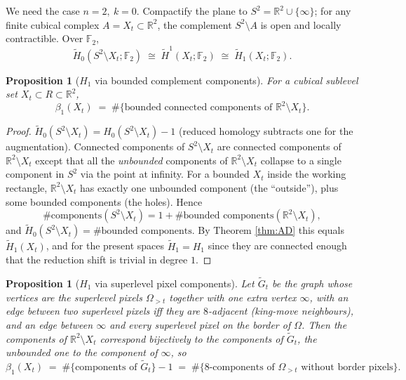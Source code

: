 \documentclass[11pt]{article}
\theoremstyle{persdef}
\newtheorem{proposition}[definition]{Proposition}
\newcommand{\R}{\mathbb{R}}
\newcommand{\F}{\mathbb{F}}
\newcommand{\Ftwo}{\F_2}
\newcommand{\X}{X}
\newcommand{\sublevG}[2]{#1_{> #2}}
\newcommand{\Hk}[1]{H_{#1}}
\begin{document}
\noindent
We need the case $n=2,\ k=0$. Compactify the plane to $S^2 = \R^2\cup\{\infty\}$; for any finite cubical complex $A=\X_t\subset\R^2$, the complement $S^2\setminus A$ is open and locally contractible. Over $\Ftwo$,
\[
\widetilde{H}_0(S^2\setminus\X_t;\Ftwo) \;\cong\; \widetilde{H}^1(\X_t;\Ftwo) \;\cong\; \widetilde{H}_1(\X_t;\Ftwo).
\]

\begin{proposition}[$H_1$ via bounded complement components]\label{prop:H1bounded}
For a cubical sublevel set $\X_t\subset R\subset\R^2$,
\[
\beta_1(\X_t) \;=\; \#\bigl\{\text{bounded connected components of }\R^2\setminus\X_t\bigr\}.
\]
\end{proposition}

\begin{proof}
$\widetilde{H}_0(S^2\setminus\X_t) = \Hk{0}(S^2\setminus\X_t) - 1$ (reduced homology subtracts one for the augmentation). Connected components of $S^2\setminus\X_t$ are connected components of $\R^2\setminus\X_t$ except that all the \emph{unbounded} components of $\R^2\setminus\X_t$ collapse to a single component in $S^2$ via the point at infinity. For a bounded $\X_t$ inside the working rectangle, $\R^2\setminus\X_t$ has exactly one unbounded component (the ``outside''), plus some bounded components (the holes). Hence
\[
\#\text{components}(S^2\setminus\X_t) = 1 + \#\text{bounded components}(\R^2\setminus\X_t),
\]
and $\widetilde{H}_0(S^2\setminus\X_t) = \#\text{bounded components}$. By Theorem \ref{thm:AD} this equals $\widetilde{H}_1(\X_t)$, and for the present spaces $\widetilde{H}_1 = \Hk{1}$ since they are connected enough that the reduction shift is trivial in degree $1$.
\end{proof}

\begin{proposition}[$H_1$ via superlevel pixel components]\label{prop:H1superlevel}
Let $\widetilde{G}_t$ be the graph whose vertices are the superlevel pixels $\sublevG{\Omega}{t}$ together with one extra vertex $\infty$, with an edge between two superlevel pixels iff they are $8$-adjacent (king-move neighbours), and an edge between $\infty$ and every superlevel pixel on the border of $\Omega$. Then the components of $\R^2\setminus\X_t$ correspond bijectively to the components of $\widetilde{G}_t$, the unbounded one to the component of $\infty$, so
\[
\beta_1(\X_t) \;=\; \#\bigl\{\text{components of }\widetilde{G}_t\bigr\} - 1 \;=\; \#\bigl\{\text{$8$-components of }\sublevG{\Omega}{t}\text{ without border pixels}\bigr\}.
\]
\end{proposition}
\end{document}
